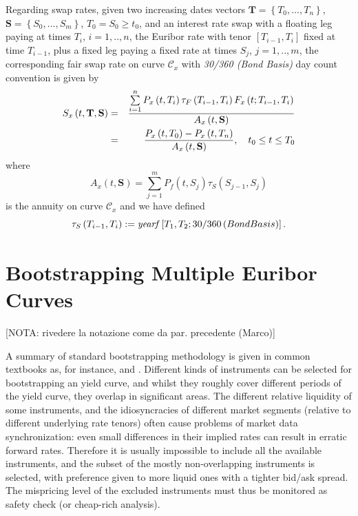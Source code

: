 \documentclass[11pt,reqno]{amsart}
\begin{document}
\par
Regarding swap rates, given two increasing dates vectors 
$\mathbf{T=}\left\{T_{0},...,T_{n}\right\}$, 
$\mathbf{S=}\left\{S_{0},...,S_{m}\right\}$, $T_{0}=S_{0}\geq t_0$, and an interest rate swap with a floating leg paying at times $T_{i}$, $i=1,..,n$, the Euribor rate with tenor 
$\left[T_{i-1},T_{i}\right]$ fixed at time $T_{i-1}$, plus a fixed leg paying a fixed rate at times $S_{j}$, $j=1,..,m$, the corresponding fair swap rate on curve $\mathcal{C}_{x}$ with \emph{30/360 (Bond Basis)} day count convention is given by
\begin{eqnarray}
S_{x}\left(t,\mathbf{T},\mathbf{S}\right) 
&=& \frac{\sum\limits_{i=1}^{n}P_{x}\left(t,T_{i}\right) \tau_F\left(T_{i-1},T_{i}\right) F_{x}\left(t;T_{i-1},T_{i}\right)}{A_{x}\left(t,\mathbf{S}\right)} \notag \\
&=& \frac{P_{x}\left(t,T_0\right) - P_{x}\left(t,T_n\right)}{A_{x}\left(t,\mathbf{S}\right)}
,\quad t_0\leq t\leq T_{0}
\label{eqn:SwapRateFwd}
\end{eqnarray}
where
\begin{equation}
A_{x}\left(t,\mathbf{S}\right) 
= \sum\limits_{j=1}^{m}P_{f}\left(t,S_{j}\right) \tau_S\left(S_{j-1},S_{j}\right)
\end{equation}
is the annuity on curve $\mathcal{C}_{x}$ and we have defined
\begin{equation}
\tau_S\left(T_{i-1},T_{i}\right)
:= \text{\textit{yearf}}\left[T_{1},T_{2};30/360\,(Bond Basis)\right].
\end{equation}

\section{\label{SecBootstrapping}Bootstrapping Multiple Euribor Curves}
[NOTA: rivedere la notazione come da par. precedente (Marco)]

A summary of standard bootstrapping methodology is given in common textbooks as, for instance, \cite{Hul08} and \cite{Reb1998}. Different kinds of instruments can be selected for bootstrapping an yield curve, and whilst they roughly cover different periods of the yield curve, they overlap in significant areas. The different relative liquidity of some instruments, and the idiosyncracies of different market segments (relative to different underlying rate tenors) often cause problems of market data synchronization: even small differences in their implied rates can result in erratic forward rates. Therefore it is usually impossible to include all the available instruments, and the subset of the mostly non-overlapping instruments is selected, with preference given to more liquid ones with a tighter bid/ask spread. The mispricing level of the excluded instruments must thus be monitored as safety check (or cheap-rich analysis).
\end{document}
